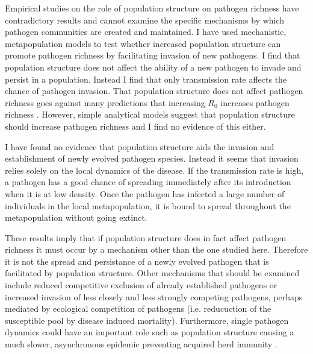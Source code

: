 
Empirical studies on the role of population structure on pathogen richness have contradictory results \cite{maganga2014bat, turmelle2009correlates, gay2014parasite} and cannot examine the specific mechanisms by which pathogen communities are created and maintained.
I have used mechanistic, metapopulation models to test whether increased population structure can promote pathogen richness by facilitating invasion of new pathogens.
I find that population structure does not affect the ability of a new pathogen to invade and persist in a population.
Instead I find that only transmission rate affects the chance of pathogen invasion.
That population structure does not affect pathogen richness goes against many predictions that increasing $R_0$ increases pathogen richness \cite{nunn2003comparative, morand2000wormy, poulin2014parasite, poulin2000diversity, altizer2003social}.
However, simple analytical models suggest that population structure should increase pathogen richness \cite{qiu2013vector, allen2004sis, nunes2006localized} and I find no evidence of this either.

I have found no evidence that population structure aids the invasion and establishment of newly evolved pathogen species.
Instead it seems that invasion relies solely on the local dynamics of the disease.
If the transmission rate is high, a pathogen has a good chance of spreading immediately after its introduction when it is at low density.
Once the pathogen has infected a large number of individuals in the local metapopulation, it is bound to spread throughout the metapopulation without going extinct.


These results imply that if population structure does in fact affect pathogen richness \cite{maganga2014bat, turmelle2009correlates, gay2014parasite} it must occur by a mechanism other than the one studied here.
Therefore it is not the spread and persistance of a newly evolved pathogen that is facilitated by population structure.
Other mechanisms that should be examined include reduced competitive exclusion of already established pathogens or increased invasion of less closely and less strongly competing pathogens, perhaps mediated by ecological competition of pathogens (i.e. reducuction of the susceptible pool by disease induced mortality).
Furthermore, single pathogen dynamics could have an important role such as population structure causing a much slower, asynchronous epidemic preventing acquired herd immunity \cite{plowright2011urban}.

